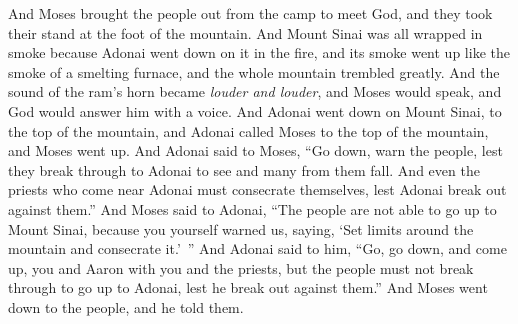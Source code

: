 \begin{biblechapter}
\verse And Moses brought the people out from the camp to meet God, and they took their stand at the foot of the mountain.
\verse And Mount Sinai was all wrapped in smoke because Adonai went down on it in the fire, and its smoke went up like the smoke of a smelting furnace, and the whole mountain trembled greatly.
\verse And the sound of the ram’s horn became \textit{louder and louder}, and Moses would speak, and God would answer him with a voice.
\verse And Adonai went down on Mount Sinai, to the top of the mountain, and Adonai called Moses to the top of the mountain, and Moses went up.
\verse And Adonai said to Moses, “Go down, warn the people, lest they break through to Adonai to see and many from them fall.
\verse And even the priests who come near Adonai must consecrate themselves, lest Adonai break out against them.”
\verse And Moses said to Adonai, “The people are not able to go up to Mount Sinai, because you yourself warned us, saying, ‘Set limits around the mountain and consecrate it.’ ”
\verse And Adonai said to him, “Go, go down, and come up, you and Aaron with you and the priests, but the people must not break through to go up to Adonai, lest he break out against them.”
\verse And Moses went down to the people, and he told them.
\end{biblechapter}

